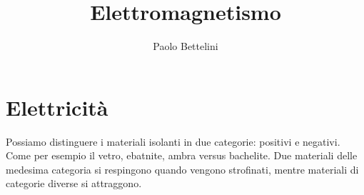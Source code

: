 \documentclass[a4paper]{article}
\title{Elettromagnetismo}
\author{Paolo Bettelini}
\date{}
\begin{document}
\maketitle
\tableofcontents

\section{Elettricità}

Possiamo distinguere i materiali isolanti in due categorie:
positivi e negativi. Come per esempio il vetro, ebatnite, ambra versus bachelite.
Due materiali delle medesima categoria si respingono quando vengono strofinati,
mentre materiali di categorie diverse si attraggono.
\end{document}
